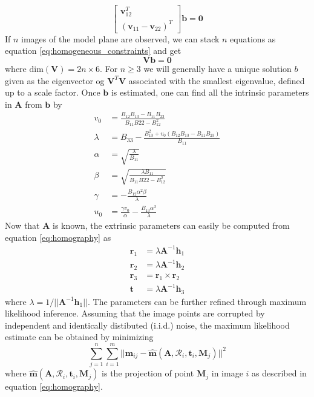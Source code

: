 \begin{equation}
\label{eq:homogeneous_constraints}
    \begin{bmatrix}\mathbf{v}_{12}^T\\
    (\mathbf{v}_{11}-\mathbf{v}_{22})^T\end{bmatrix}\mathbf{b}=\mathbf{0}
\end{equation}
If $n$ images of the model plane are observed, we can stack $n$ equations as equation \ref{eq:homogeneous_constraints} and get
\begin{equation}
\label{eq:analytic_calib}
    \mathbf{Vb}=\mathbf{0}
\end{equation}
where $\text{dim}(\mathbf{V})=2n\times6$. For $n\geq3$ we will generally have a unique solution $b$ given as the eigenvector og $\mathbf{V}^T\mathbf{V}$ associated with the smallest eigenvalue, defined up to a scale factor. Once $\mathbf{b}$ is estimated, one can find all the intrinsic parameters in $\mathbf{A}$ from $\mathbf{b}$ by
\begin{equation}
    \begin{split}
    v_0&=\frac{B_{12}B_{13}-B_{11}B_{23}}{B_{11}B{22}-B_{12}^2}\\
    \lambda &=B_{33}-\frac{B_{13}^2+v_0(B_{12}B_{13}-B_{11}B_{23})}{B_{11}}\\
    \alpha &=\sqrt{\frac{\lambda}{B_{11}}}\\
    \beta &=\sqrt{\frac{\lambda B_{11}}{B_{11}B{22}-B_{12}^2}}\\
    \gamma &=-\frac{B_{12}\alpha^2\beta}{\lambda}\\
    u_0 &=\frac{\gamma v_0}{\alpha}-\frac{B_{13}\alpha^2}{\lambda}
    \end{split}
\end{equation}
Now that $\mathbf{A}$ is known, the extrinsic parameters can easily be computed from equation \ref{eq:homography} as
\begin{equation}
    \begin{split}
        \mathbf{r}_1 &=\lambda\mathbf{A}^{-1}\mathbf{h}_1\\
        \mathbf{r}_2&=\lambda\mathbf{A}^{-1}\mathbf{h}_2\\
        \mathbf{r}_3&=\mathbf{r}_1\times\mathbf{r}_2\\
        \mathbf{t}&=\lambda\mathbf{A}^{-1}\mathbf{h}_3
    \end{split}
\end{equation}
where $\lambda=1/||\mathbf{A}^{-1}\mathbf{h}_1||$. The parameters can be further refined through maximum likelihood inference. Assuming that the image points are corrupted by independent and identically distibuted (i.i.d.) noise, the maximum likelihood estimate can be obtained by minimizing 
\begin{equation}
\label{eq:max_likelihood_calib}
    \sum_{j=1}^{n}\sum_{i=1}^{m}||\mathbf{m}_{ij}-\hat{\mathbf{m}}(\mathbf{A},\mathcal{R}_i,\mathbf{t}_i,\mathbf{M}_j)||^2
\end{equation}
where $\hat{\mathbf{m}}(\mathbf{A},\mathcal{R}_i,\mathbf{t}_i,\mathbf{M}_j)$ is the projection of point $\mathbf{M}_j$ in image $i$ as described in equation \ref{eq:homography}.
